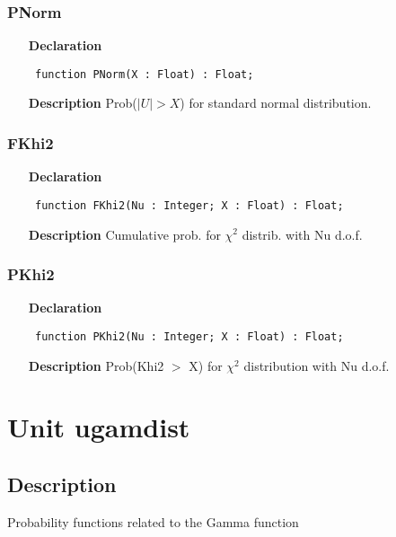 \documentclass[12pt,a4paper,oneside]{report}
\newcommand{\declarationitem}[1]{\textbf{#1}}
\newcommand{\descriptiontitle}[1]{\textbf{#1}}
\newcommand{\code}[1]{\texttt{#1}}
\begin{document}
\subsubsection{PNorm}
\label{uigmdist-PNorm}
\begin{itemize}\item[\declarationitem{Declaration}\hfill]
	\begin{flushleft}
		\code{
			function PNorm(X : Float) : Float;}
	\end{flushleft}
	\item[\descriptiontitle{Description}]
	Prob($|U| > X$) for standard normal distribution.
\end{itemize}
\subsubsection{FKhi2}
\label{uigmdist-FKhi2}
\begin{itemize}\item[\declarationitem{Declaration}\hfill]
	\begin{flushleft}
		\code{
			function FKhi2(Nu : Integer; X : Float) : Float;}
	\end{flushleft}
	\item[\descriptiontitle{Description}]
	Cumulative prob. for $\chi^2$ distrib. with Nu d.o.f.
\end{itemize}
\subsubsection{PKhi2}
\label{uigmdist-PKhi2}
\begin{itemize}\item[\declarationitem{Declaration}\hfill]
	\begin{flushleft}
		\code{
			function PKhi2(Nu : Integer; X : Float) : Float;}
	\end{flushleft}
	\item[\descriptiontitle{Description}]
	Prob(Khi2 {$>$} X) for $\chi^2$ distribution with Nu d.o.f.
\end{itemize}
\section{Unit ugamdist}
\label{ugamdist}
\subsection{Description}
Probability functions related to the Gamma function 
\end{document}
